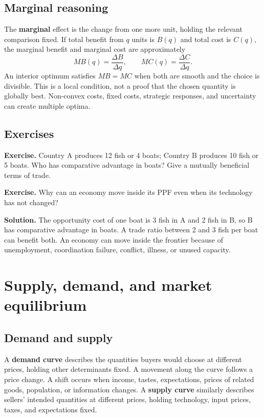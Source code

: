 \documentclass[11pt,oneside,openany]{book}
\newcommand{\term}[1]{\textbf{#1}\index{#1}}
\newcommand{\exercise}[1]{\textbf{Exercise.} #1}
\newcommand{\solution}[1]{\textbf{Solution.} #1}
\begin{document}
\section{Marginal reasoning}

The \term{marginal} effect is the change from one more unit, holding the relevant comparison fixed. If total benefit from $q$ units is $B(q)$ and total cost is $C(q)$, the marginal benefit and marginal cost are approximately
\[
  MB(q)=\frac{\Delta B}{\Delta q},\qquad MC(q)=\frac{\Delta C}{\Delta q}.
\]
An interior optimum satisfies $MB=MC$ when both are smooth and the choice is divisible. This is a local condition, not a proof that the chosen quantity is globally best. Non-convex costs, fixed costs, strategic responses, and uncertainty can create multiple optima.

\section{Exercises}

\exercise{Country A produces 12 fish or 4 boats; Country B produces 10 fish or 5 boats. Who has comparative advantage in boats? Give a mutually beneficial terms of trade.}

\exercise{Why can an economy move inside its PPF even when its technology has not changed?}

\solution{The opportunity cost of one boat is 3 fish in A and 2 fish in B, so B has comparative advantage in boats. A trade ratio between 2 and 3 fish per boat can benefit both. An economy can move inside the frontier because of unemployment, coordination failure, conflict, illness, or unused capacity.}

\chapter{Supply, demand, and market equilibrium}
\label{ch:markets}

\section{Demand and supply}

A \term{demand curve} describes the quantities buyers would choose at different prices, holding other determinants fixed. A movement along the curve follows a price change. A shift occurs when income, tastes, expectations, prices of related goods, population, or information changes. A \term{supply curve} similarly describes sellers' intended quantities at different prices, holding technology, input prices, taxes, and expectations fixed.
\end{document}
